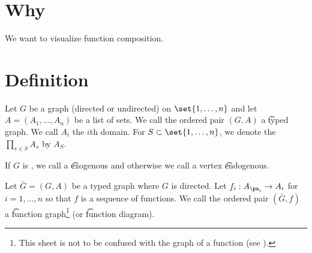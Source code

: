

\section*{Why}

We want to visualize function composition.

\section*{Definition}

Let $G$ be a graph (directed or undirected) on $\set{1, \dots , n}$ and let $A = (A_1, \dots , A_n)$ be a list of sets.
We call the ordered pair $(G, A)$ a \t{typed graph}.
We call $A_i$ the \t{$i$th domain}.
For $S \subset \set{1, \dots , n}$, we denote the $\prod_{s \in S} A_s$ by $A_S$.

If $G$ is , we call a \t{exogenous} and otherwise we call a vertex \t{endogenous}.

Let $\bar{G} = (G, A)$ be a typed graph where $G$ is directed.
Let $f_i: A_{\pa_{i}} \to A_i$ for $i = 1, \dots , n$ so that $f$ is a sequence of functions.
We call the ordered pair $(\bar{G}, f)$ a \t{function graph}\footnote{This sheet is not to be confused with the graph of a function (see ).}
(or \t{function diagram}).

\blankpage